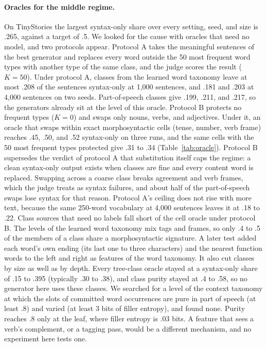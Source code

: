 \documentclass[11pt,letterpaper]{article}
\begin{document}
\paragraph{Oracles for the middle regime.} On TinyStories the largest syntax-only share over every setting, seed, and size is .265, against a target of .5. We looked for the cause with oracles that need no model, and two protocols appear.
Protocol A takes the meaningful sentences of the best generator and replaces every word outside the 50 most frequent word types with another type of the same class, and the judge scores the result ($K=50$).
Under protocol A, classes from the learned word taxonomy leave at most .208 of the sentences syntax-only at 1,000 sentences, and .181 and .203 at 4,000 sentences on two seeds. Part-of-speech classes give .199, .211, and .217, so the generators already sit at the level of this oracle.
Protocol B protects no frequent types ($K=0$) and swaps only nouns, verbs, and adjectives. Under it, an oracle that swaps within exact morphosyntactic cells (tense, number, verb frame) reaches .45, .50, and .52 syntax-only on three runs, and the same cells with the 50 most frequent types protected give .31 to .34 (Table~\ref{tab:oracle}).
Protocol B supersedes the verdict of protocol A that substitution itself caps the regime: a clean syntax-only output exists when classes are fine and every content word is replaced.
Swapping across a coarse class breaks agreement and verb frames, which the judge treats as syntax failures, and about half of the part-of-speech swaps lose syntax for that reason.
Protocol A's ceiling does not rise with more text, because the same 250-word vocabulary at 4,000 sentences leaves it at .18 to .22.
Class sources that need no labels fall short of the cell oracle under protocol B. The levels of the learned word taxonomy mix tags and frames, so only .4 to .5 of the members of a class share a morphosyntactic signature.
A later test added each word's own ending (its last one to three characters) and the nearest function words to the left and right as features of the word taxonomy. It also cut classes by size as well as by depth.
Every tree-class oracle stayed at a syntax-only share of .15 to .395 (typically .30 to .38), and class purity stayed at .4 to .58, so no generator here uses these classes.
We searched for a level of the context taxonomy at which the slots of committed word occurrences are pure in part of speech (at least .8) and varied (at least 3 bits of filler entropy), and found none. Purity reaches .8 only at the leaf, where filler entropy is .03 bits.
A feature that sees a verb's complement, or a tagging pass, would be a different mechanism, and no experiment here tests one.
\end{document}
